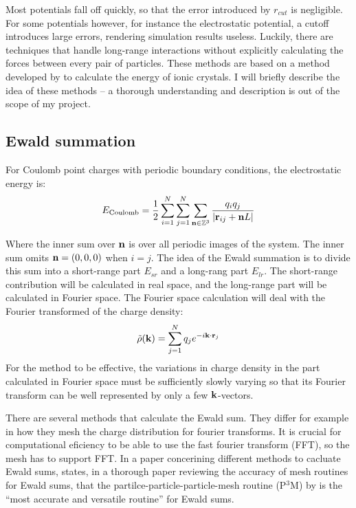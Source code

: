 Most potentials fall off quickly, so that the error introduced by $r_{cut}$ is negligible. For some potentials however, for instance the electrostatic potential, a cutoff introduces large errors, rendering simulation results useless. Luckily, there are techniques that handle long-range interactions without explicitly calculating the forces between every pair of particles. These methods are based on a method developed by \citet{ANDP:ANDP19213690304} to calculate the energy of ionic crystals. I will briefly describe the idea of these methods -- a thorough understanding and description is out of the scope of my project.

\subsection{Ewald summation}
For Coulomb point charges with periodic boundary conditions, the electrostatic energy is:
\begin{equation}
	E_{\text{Coulomb}} = \frac{1}{2} \sum_{i=1}^N\sum_{j=1}^N \sum_{\mathbf{n} \in \mathbb{Z}^3} \frac{q_iq_j}{|\mathbf{r}_{ij}+\mathbf{n} L|} 
\end{equation}

Where the inner sum over $\mathbf{n}$ is over all periodic images of the system. The inner sum omits $\mathbf{n} = (0, 0, 0)$ when $i=j$. The idea of the Ewald summation is to divide this sum into a short-range part $E_{sr}$ and a long-rang part $E_{lr}$. The short-range contribution will be calculated in real space, and the long-range part will be calculated in Fourier space. The Fourier space calculation will deal with the Fourier transformed of the charge density:
\begin{equation}
	\tilde{\rho}(\mathbf{k}) = \sum_{j=1}^N q_j e^{-i\mathbf{k}\cdot \mathbf{r}_j}
\end{equation}
For the method to be effective, the variations in charge density in the part calculated in Fourier space must be sufficiently slowly varying so that its Fourier transform can be well represented by only a few $\mathbf{k}$-vectors.

There are several methods that calculate the Ewald sum. They differ for example in how they mesh the charge distribution for fourier transforms. It is crucial for computational eficiency to be able to use the fast fourier transform (FFT), so the mesh has to support FFT. In a paper concerining different methods to cacluate Ewald sums, \citet{Deserno1998} states, in a thorough paper reviewing the accuracy of mesh routines for Ewald sums, that the partilce-particle-particle-mesh routine (P$^3$M) by \citet{Hockney:1988:CSU:62815} is the ``most accurate and versatile routine'' for Ewald sums. 

